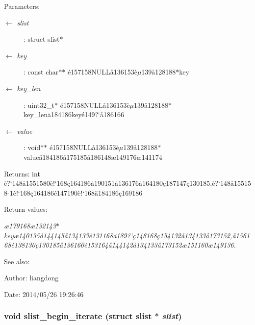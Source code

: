 \begin{Desc}
\item[Parameters:]
\begin{description}
\item[\mbox{$\leftarrow$} {\em slist}]: struct slist$\ast$ \item[\mbox{$\leftarrow$} {\em key}]: const char$\ast$$\ast$ \'{e}157158NULL\aa{}136153\`{e}$\mu$139\aa{}128188$\ast$key \item[\mbox{$\leftarrow$} {\em key\_\-len}]: uint32\_\-t$\ast$ \'{e}157158NULL\aa{}136153\`{e}$\mu$139\aa{}128188$\ast$key\_\-len\"{a}184186key\'{e}149?`\aa{}186166 \item[\mbox{$\leftarrow$} {\em value}]: void$\ast$$\ast$ \'{e}157158NULL\aa{}136153\`{e}$\mu$139\aa{}128188$\ast$value\"{a}184186\aa{}175185\aa{}186148\ae{}149176\ae{}141174 \end{description}
\end{Desc}
\begin{Desc}
\item[Returns:]int \`{e}?`148\aa{}1551580\`{e}!`168\c{c}164186\aa{}190151\aa{}136176\aa{}164180\c{c}187147\c{c}130185,\`{e}?`148\aa{}155158-1\`{e}!`168\c{c}164186\'{e}147190\`{e}!`168\"{a}184186\c{c}169186 \end{Desc}
\begin{Desc}
\item[Return values:]
\begin{description}
\item[{\em \ae{}179168\ae{}132143$\ast$key\ae{}140135\aa{}144145\aa{}134133\'{e}131168\"{a}189?`\c{c}148168\c{c}154132\aa{}134133\aa{}173152,\aa{}156168\`{e}138130\c{c}130185\aa{}136160\'{e}153164\aa{}144142\aa{}134133\aa{}173152\ae{}151160\ae{}149136.}]\end{description}
\end{Desc}
\begin{Desc}
\item[See also:]\end{Desc}
\begin{Desc}
\item[Author:]liangdong \end{Desc}
\begin{Desc}
\item[Date:]2014/05/26 19:26:46 \end{Desc}
\subsubsection{\setlength{\rightskip}{0pt plus 5cm}void slist\_\-begin\_\-iterate (struct slist $\ast$ {\em slist})}\label{slist_8h_a10}


